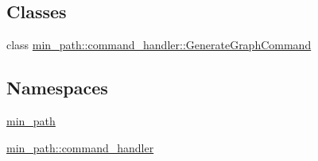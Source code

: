 \subsection*{Classes}
\begin{DoxyCompactItemize}
\item 
class \hyperlink{a00006}{min\+\_\+path\+::command\+\_\+handler\+::\+Generate\+Graph\+Command}
\end{DoxyCompactItemize}
\subsection*{Namespaces}
\begin{DoxyCompactItemize}
\item 
 \hyperlink{a00033}{min\+\_\+path}
\item 
 \hyperlink{a00035}{min\+\_\+path\+::command\+\_\+handler}
\end{DoxyCompactItemize}
